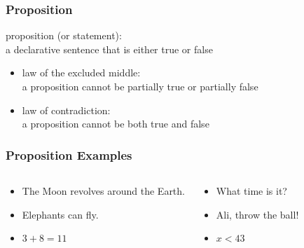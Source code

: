 \documentclass[dvipsnames]{beamer}
\begin{document}
\begin{frame}
  \frametitle{Proposition}

  \begin{definition}
    \alert{proposition} (or \alert{statement}):\\
      a declarative sentence that is either true or false
  \end{definition}

  \pause
  \begin{itemize}
    \item \alert{law of the excluded middle}:\\
      a proposition cannot be partially true or partially false
  \end{itemize}

  \pause
  \begin{itemize}
    \item \alert{law of contradiction}:\\
      a proposition cannot be both true and false
  \end{itemize}
\end{frame}

\begin{frame}
  \frametitle{Proposition Examples}

  \begin{columns}[t]
    \begin{example}[proposition]
      \begin{itemize}
        \item The Moon revolves around the Earth.
        \item Elephants can fly.
        \item $3+8=11$
      \end{itemize}
    \end{example}

    \pause
    \begin{example}
      \begin{itemize}
        \item What time is it?
        \item Ali, throw the ball!
        \item $x<43$
      \end{itemize}
    \end{example}
  \end{columns}
\end{frame}
\end{document}
